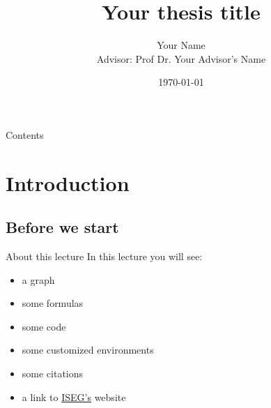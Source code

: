


\title[Your thesis title]{Your thesis title}

\author[Your Name]{Your Name \\ \footnotesize{\normalfont Advisor: Prof Dr. Your Advisor's Name}}

\date{\today}



\begin{frame}
	\titlepage
\end{frame}

\begin{frame}{Contents}
	\tableofcontents
\end{frame}


\section{Introduction}

\subsection{Before we start}

\begin{frame}{About this lecture}
	In this lecture you will see:
	\begin{itemize}
	\item a graph
	\item some formulas
	\item some code
	\item some customized environments
	\item some citations \citep{kass1995}
	\item a link to \href{https://www.iseg.ulisboa.pt/aquila/instituicao/ISEG/}{ISEG's} website
	\end{itemize}
\end{frame}

